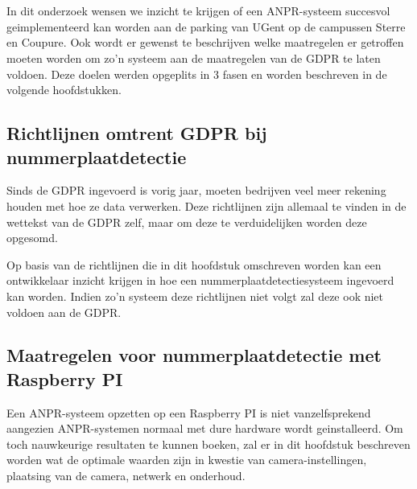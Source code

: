 
\chapter{}
\label{ch:methodologie}


In dit onderzoek wensen we inzicht te krijgen of een ANPR-systeem succesvol geimplementeerd kan worden aan de parking van UGent op de campussen Sterre en Coupure. Ook wordt er gewenst te beschrijven welke maatregelen er getroffen moeten worden om zo'n systeem aan de maatregelen van de GDPR te laten voldoen. Deze doelen werden opgeplits in 3 fasen en worden beschreven in de volgende hoofdstukken.

\section{Richtlijnen omtrent GDPR bij nummerplaatdetectie}
Sinds de GDPR ingevoerd is vorig jaar, moeten bedrijven veel meer rekening houden met hoe ze data verwerken. Deze richtlijnen zijn allemaal te vinden in de wettekst van de GDPR zelf, maar om deze te verduidelijken worden deze opgesomd.

Op basis van de richtlijnen die in dit hoofdstuk omschreven worden kan een ontwikkelaar inzicht krijgen in hoe een nummerplaatdetectiesysteem ingevoerd kan worden. Indien zo'n systeem deze richtlijnen niet volgt zal deze ook niet voldoen aan de GDPR. 

\section{Maatregelen voor nummerplaatdetectie met Raspberry PI}
Een ANPR-systeem opzetten op een Raspberry PI is niet vanzelfsprekend aangezien ANPR-systemen normaal met dure hardware wordt geinstalleerd. Om toch nauwkeurige resultaten te kunnen boeken, zal er in dit hoofdstuk beschreven worden wat de optimale waarden zijn in kwestie van camera-instellingen, plaatsing van de camera, netwerk en onderhoud.

